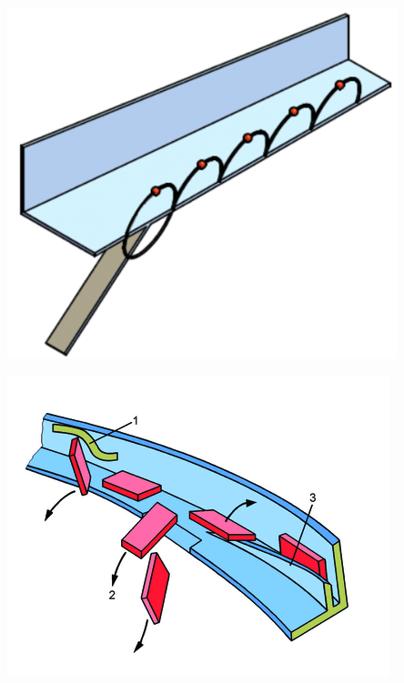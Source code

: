 \begin{minipage}{0.475\textwidth}	
	\includegraphics[width=0.85\textwidth]{Illustrationen/5-Konzept/foerderbewegung.png}
	\label{fig:foerderbewegung}
\end{minipage}
\hfill
\begin{minipage}{0.475\textwidth}
	\includegraphics[width=\textwidth]{Illustrationen/5-Konzept/schikane.png}
	\label{fig:schikane}
\end{minipage}	

